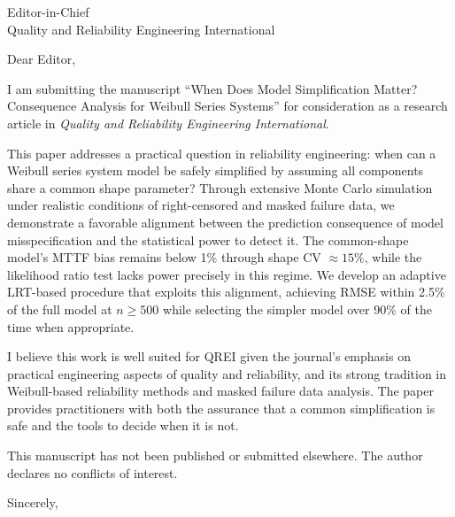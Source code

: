 \documentclass[11pt]{letter}
\date{\today}
\begin{document}
\begin{letter}{Editor-in-Chief\\Quality and Reliability Engineering International}

\opening{Dear Editor,}

I am submitting the manuscript ``When Does Model Simplification Matter? Consequence Analysis for Weibull Series Systems'' for consideration as a research article in \textit{Quality and Reliability Engineering International}.

This paper addresses a practical question in reliability engineering: when can a Weibull series system model be safely simplified by assuming all components share a common shape parameter? Through extensive Monte Carlo simulation under realistic conditions of right-censored and masked failure data, we demonstrate a favorable alignment between the prediction consequence of model misspecification and the statistical power to detect it. The common-shape model's MTTF bias remains below 1\% through shape CV $\approx 15\%$, while the likelihood ratio test lacks power precisely in this regime. We develop an adaptive LRT-based procedure that exploits this alignment, achieving RMSE within 2.5\% of the full model at $n \geq 500$ while selecting the simpler model over 90\% of the time when appropriate.

I believe this work is well suited for QREI given the journal's emphasis on practical engineering aspects of quality and reliability, and its strong tradition in Weibull-based reliability methods and masked failure data analysis. The paper provides practitioners with both the assurance that a common simplification is safe and the tools to decide when it is not.

This manuscript has not been published or submitted elsewhere. The author declares no conflicts of interest.

\closing{Sincerely,}

\end{letter}
\end{document}
